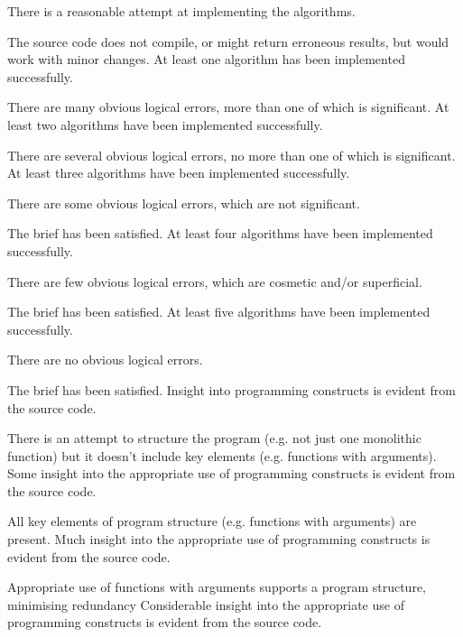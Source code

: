 \documentclass{../../fal_assignment}
\begin{document}
\begin{markingrubric}
        \grade\fail 	There is a reasonable attempt at implementing the algorithms.
            \par 		The source code does not compile, or might return erroneous results, but would work with minor changes.
        \grade 		At least one algorithm has been implemented successfully.
            \par 		There are many obvious logical errors, more than one of which is significant.   
        \grade 		At least two algorithms have been  implemented successfully.
            \par 		There are several obvious logical errors, no more than one of which is significant. 
        \grade 		At least three algorithms have been implemented successfully.
            \par 		There are some obvious logical errors, which are not significant. 
            \par		The brief has been satisfied.
        \grade 		At least four algorithms have been implemented successfully.
            \par 		There are few obvious logical errors, which are cosmetic and/or superficial.
            \par		The brief has been satisfied.     
        \grade 		At least five algorithms have been implemented successfully.
            \par		There are no obvious logical errors.
            \par		The brief has been satisfied.
%
        \grade\fail Insight into programming constructs is evident from the source code.
            \par There is an attempt to structure the program (e.g. not just one monolithic function) but it doesn't include key elements (e.g. functions with arguments).
        \grade Some insight into the appropriate use of programming constructs is evident from the source code.
            \par All key elements of program structure (e.g. functions with arguments) are present.
        \grade Much insight into the appropriate use of programming constructs is evident from the source code.
            \par Appropriate use of functions with arguments supports a program structure, minimising redundancy
        \grade Considerable insight into the appropriate use of programming constructs is evident from the source code.

\end{markingrubric}
\end{document}
